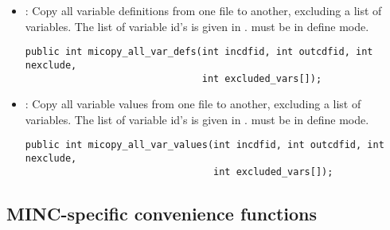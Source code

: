 \begin{itemize}
\item {} : Copy all variable definitions from
one file to another, excluding a list of variables. The list of
 variable id's is given in .
 must be in define mode.
\begin{verbatim}
public int micopy_all_var_defs(int incdfid, int outcdfid, int nexclude,
                               int excluded_vars[]);
\end{verbatim}

\item {} : Copy all variable values from one
file to another, excluding a list of variables.  The list of
 variable id's is given in .
 must be in define mode.
\begin{verbatim}
public int micopy_all_var_values(int incdfid, int outcdfid, int nexclude,
                                 int excluded_vars[]);
\end{verbatim}

\end{itemize}

\subsection{MINC-specific convenience functions}


